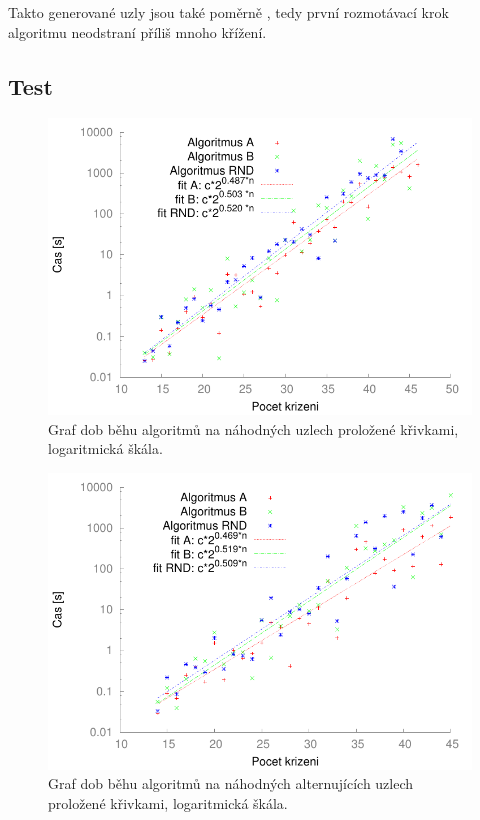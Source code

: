 Takto generované uzly jsou také poměrně , tedy první rozmotávací krok algoritmu neodstraní příliš mnoho křížení.

\subsection{Test}

\begin{figure}[p]\centering
\includegraphics{../img/knotsFIT}
\caption{Graf dob běhu algoritmů na náhodných uzlech proložené křivkami, logaritmická škála.}
\label{obr03:knotSrov}
\end{figure}

\begin{figure}[p]\centering
\includegraphics{../img/alt_knotsFIT}
\caption{Graf dob běhu algoritmů na náhodných alternujících uzlech proložené křivkami, logaritmická škála.}
\label{obr03:altSrov}
\end{figure}

